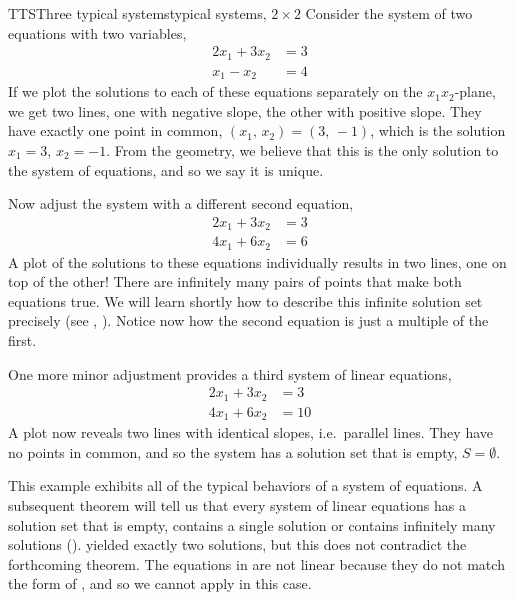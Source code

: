 \begin{example}{TTS}{Three typical systems}{typical systems, $2\times 2$}
Consider the system of two equations with two variables,
%
\begin{align*}
2x_1+3x_2&=3\\
x_1-x_2&=4
\end{align*}
%
If we plot the solutions to each of these equations separately on the $x_{1}x_{2}$-plane, we get two lines, one with negative slope, the other with positive slope.  They have exactly one point in common, $(x_1,\,x_2)=(3,\,-1)$, which is the solution $x_1=3$, $x_2=-1$.  From the geometry, we believe that this is the only solution to the system of equations, and so we say it is unique.\par
%
Now adjust the system with a different second equation,
%
\begin{align*}
2x_1+3x_2&=3\\
4x_1+6x_2&=6
\end{align*}
%
A plot of the solutions to these equations individually results in two lines, one on top of the other!  There are infinitely many pairs of points that make both equations true.  We will learn shortly how to describe this infinite solution set precisely (see , ).  Notice now how the second equation is just a multiple of the first.\par
%
One more minor adjustment provides a third system of linear equations,
%
\begin{align*}
2x_1+3x_2&=3\\
4x_1+6x_2&=10
\end{align*}
%
A plot now reveals two lines with identical slopes, i.e.\ parallel lines.  They have no points in common, and so the system has a solution set that is empty, $S=\emptyset$.
\end{example}
%
This example exhibits all of the typical behaviors of a system of equations.  A subsequent theorem will tell us that every system of linear equations has a solution set that is empty, contains a single solution or contains infinitely many solutions ().   yielded exactly two solutions, but this does not contradict the forthcoming theorem.  The equations in  are not linear because they do not match the form of , and so we cannot apply  in this case.\par
%
